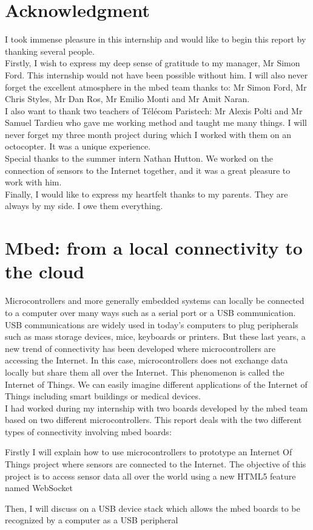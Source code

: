 \documentclass[pdftex,10pt,a4paper]{report}
\newenvironment{packed_item}{
\begin{itemize}
  \setlength{\itemsep}{1pt}
  \setlength{\parskip}{0pt}
  \setlength{\parsep}{0pt}
}{\end{itemize}}
\begin{document}



\chapter*{Acknowledgment}
I took immense pleasure in this internship and would like to begin this report by thanking several people. \\

Firstly, I wish to express my deep sense of gratitude to my manager, Mr Simon Ford. This internship would not have been possible without him. I will also never forget the excellent atmosphere in the mbed team thanks to: Mr Simon Ford, Mr Chris Styles, Mr Dan Ros, Mr Emilio Monti and Mr Amit Naran. \\

I also want to thank two teachers of T\'{e}l\'{e}com Paristech: Mr Alexis Polti and Mr Samuel Tardieu who gave me working method and taught me many things. I will never forget my three month project during which I worked with them on an octocopter. It was a unique experience. \\

Special thanks to the summer intern Nathan Hutton. We worked on the connection of sensors to the Internet together, and it was a great pleasure to work with him. \\

Finally, I would like to express my heartfelt thanks to my parents. They are always by my side. I owe them everything.

\chapter*{Mbed: from a local connectivity to the cloud}
Microcontrollers and more generally embedded systems can locally be connected to a computer over many ways such as a serial port or a USB communication. USB communications are widely used in today's computers to plug peripherals such as mass storage devices, mice, keyboards or printers. But these last years, a new trend of connectivity has been developed where microcontrollers are accessing the Internet. In this case, microcontrollers does not exchange data locally but share them all over the Internet. This phenomenon is called the Internet of Things. We can easily imagine different applications of the Internet of Things including smart buildings or medical devices. \\

I had worked during my internship with two boards developed by the mbed team based on two different microcontrollers. This report deals with the two different types of connectivity involving mbed boards:
\begin{packed_item}
	\item Firstly I will explain how to use microcontrollers to prototype an Internet Of Things project where sensors are connected to the Internet. The objective of this project is to access sensor data all over the world using a new HTML5 feature named WebSocket
	\item Then, I will discuss on a USB device stack which allows the mbed boards to be recognized by a computer as a USB peripheral
\end{packed_item}
\end{document}
